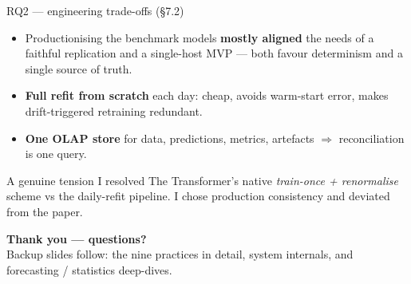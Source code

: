 \documentclass[aspectratio=169,10pt]{beamer}
\begin{document}
\begin{frame}{RQ2 --- engineering trade-offs \hfill\small(\S7.2)}
  \begin{itemize}
    \item Productionising the benchmark models \textbf{mostly aligned} the needs of a
      faithful replication and a single-host MVP --- both favour determinism and a single
      source of truth.
    \item \textbf{Full refit from scratch} each day: cheap, avoids warm-start error, makes
      drift-triggered retraining redundant.
    \item \textbf{One OLAP store} for data, predictions, metrics, artefacts $\Rightarrow$
      reconciliation is one query.
  \end{itemize}
  \vfill
  \begin{block}{A genuine tension I resolved}
    The Transformer's native \emph{train-once + renormalise} scheme vs the daily-refit
    pipeline. I chose production consistency and deviated from the paper.
  \end{block}
\end{frame}


\begin{frame}[plain]
  \vfill\centering
  {\color{dtured}\Large\bfseries Thank you --- questions?}\\[1em]
  {\footnotesize Backup slides follow: the nine practices in detail, system internals,
  and forecasting / statistics deep-dives.}
  \vfill
\end{frame}
\end{document}
